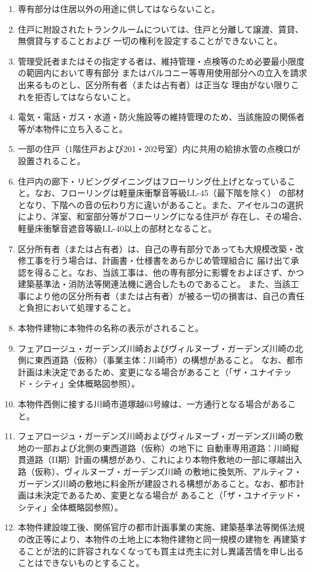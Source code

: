 \documentclass[
  twoside,
  luatex,
  paper=a4paper,
  fontsize=11pt,
  jafontsize=11pt,
  jlreq_notes,
]{jlreq}
\begin{document}
  \begin{enumerate}
  \item 専有部分は住居以外の用途に供してはならないこと。
  \item 住戸に附設されたトランクルームについては、住戸と分離して譲渡、賃貸、無償貸与することおよび
        一切の権利を設定することができないこと。
  \item 管理受託者またはその指定する者は、維持管理・点検等のため必要最小限度の範囲内において専有部分
        またはバルコニー等専用使用部分への立入を請求出来るものとし、区分所有者（または占有者）は正当な
        理由がない限りこれを拒否してはならないこと。
  \item 電気・電話・ガス・水道・防火施設等の維持管理のため、当該施設の関係者等が本物件に立ち入ること。
  \item 一部の住戸（1階住戸および201・202号室）内に共用の給排水管の点検口が設置されること。
  \item 住戸内の廊下・リビングダイニングはフローリング仕上げとなっていること。なお、フローリングは軽量床衝撃音等級LL-45（最下階を除く）
        の部材となり、下階への音の伝わり方に違いがあること。また、アイセルコの選択により、洋室、和室部分等がフローリングになる住戸が
        存在し、その場合、軽量床衝撃音遮音等級LL-40以上の部材となること。
  \item 区分所有者（または占有者）は、自己の専有部分であっても大規模改築・改修工事を行う場合は、計画書・仕様書をあらかじめ管理組合に
        届け出て承認を得ること。なお、当該工事は、他の専有部分に影響をおよぼさず、かつ建築基準法・消防法等関連法機に適合したものであること。
        また、当該工事により他の区分所有者（または占有者）が被る一切の損害は、自己の責任と負担において処理すること。
  \item 本物件建物に本物件の名称の表示がされること。
  \item フェアロージュ・ガーデンズ川崎およびヴィルヌーブ・ガーデンズ川崎の北側に東西道路（仮称）（事業主体：川崎市）の構想があること。
        なお、都市計画は未決定であるため、変更になる場合があること（「ザ・ユナイテッド・シティ」全体概略図参照）。
  \item 本物件西側に接する川崎市道塚越63号線は、一方通行となる場合があること。
  \item フェアロージュ・ガーデンズ川崎およびヴィルヌーブ・ガーデンズ川崎の敷地の一部および北側の東西道路（仮称）の地下に
        自動車専用道路：川崎縦貫道路（II期）計画の構想があり、これにより本物件敷地の一部に塚越出入路（仮称）、ヴィルヌーブ・ガーデンズ川崎
        の敷地に換気所、アルティフ・ガーデンズ川崎の敷地に料金所が建設される構想があること。なお、都市計画は未決定であるため、変更となる場合が
        あること（「ザ・ユナイテッド・シティ」全体概略図参照）。
  \item 本物件建設竣工後、関係官庁の都市計画事業の実施、建築基準法等関係法規の改正等により、本物件の土地上に本物件建物と同一規模の建物を
        再建築することが法的に許容されなくなっても買主は売主に対し異議苦情を申し出ることはできないものとすること。
  

\end{enumerate}
\end{document}
